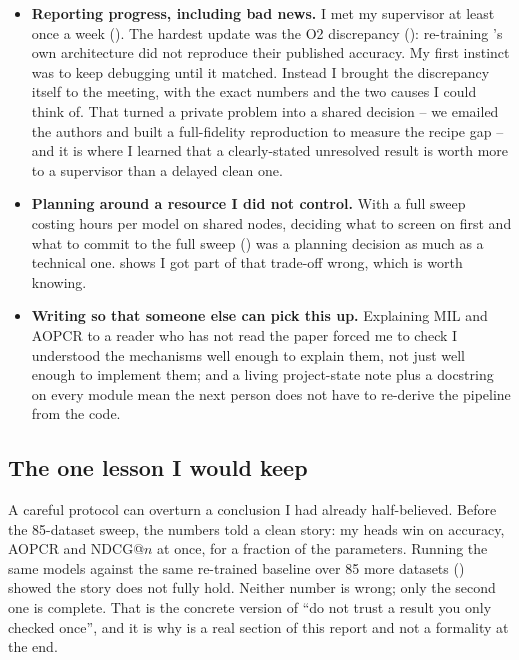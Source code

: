 \begin{itemize}\itemsep3pt
  \item \textbf{Reporting progress, including bad news.} I met my supervisor at least once a week
        (). The hardest update was the O2 discrepancy ():
        re-training \millet{}'s own architecture did not reproduce their published accuracy. My
        first instinct was to keep debugging until it matched. Instead I brought the discrepancy
        itself to the meeting, with the exact numbers and the two causes I could think of. That
        turned a private problem into a shared decision -- we emailed the authors and built a
        full-fidelity reproduction to measure the recipe gap -- and it is where I learned that a
        clearly-stated unresolved result is worth more to a supervisor than a delayed clean one.

  \item \textbf{Planning around a resource I did not control.} With a full sweep costing hours per
        model on shared nodes, deciding what to screen on \webtraffic{} first and what to commit to
        the full sweep () was a planning decision as much as a technical one.
         shows I got part of that trade-off wrong, which is worth knowing.

  \item \textbf{Writing so that someone else can pick this up.} Explaining MIL and AOPCR to a reader
        who has not read the \millet{} paper forced me to check I understood the mechanisms well
        enough to explain them, not just well enough to implement them; and a living project-state
        note plus a docstring on every module mean the next person does not have to re-derive the
        pipeline from the code.
\end{itemize}

\subsection{The one lesson I would keep}

A careful protocol can overturn a conclusion I had already half-believed. Before the 85-dataset
\ucr{} sweep, the \webtraffic{} numbers told a clean story: my heads win on accuracy, AOPCR and
NDCG@$n$ at once, for a fraction of the parameters. Running the same models against the same
re-trained baseline over 85 more datasets () showed the story does not fully hold.
Neither number is wrong; only the second one is complete. That is the concrete version of ``do not
trust a result you only checked once'', and it is why  is a real section
of this report and not a formality at the end.
